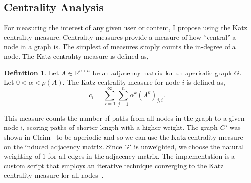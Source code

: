\documentclass[letterpaper, 10 pt, conference]{ieeeconf}
\theoremstyle{definition}
\newtheorem{definition}{Definition}[section]
\newcommand{\R}{\mathbb{R}}
\begin{document}
\subsection{Centrality Analysis}
For measuring the interest of any given user or content, I propose using the Katz centrality measure. Centrality measures provide a measure of how ``central'' a node in a graph is. The simplest of measures simply counts the in-degree of a node. The Katz centrality measure is defined as,
\begin{definition}
  Let \(A\in \R^{n\times n}\) be an adjacency matrix for an aperiodic graph \(G.\) Let \(0 < \alpha < \rho(A)\). The Katz centrality measure for node \(i\) is defined as,
  \[
    c_i = \sum_{k=1}^\infty{ \sum_{j=1}^n {\alpha^k \left( A^k \right)_{j,i}} }.
  \]
\end{definition}
This measure counts the number of paths from all nodes in the graph to a given node \(i\), scoring paths of shorter length with a higher weight. The graph \(G'\) was shown in Claim~\cite{claim:g1:aperiodic} to be aperiodic and so we can use the Katz centrality measure on the induced adjacency matrix. Since \(G'\) is unweighted, we choose the natural weighting of \(1\) for all edges in the adjacency matrix. The implementation is a custom script that employs an iterative technique converging to the Katz centrality measure for all nodes~\cite{Notes:Network}.
\end{document}
